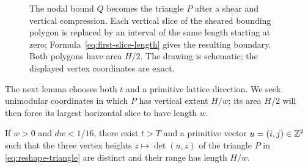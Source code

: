 \begin{figure}[tbp]
\centering
{}
\caption{The nodal bound $Q$ becomes the triangle $P$ after a shear and
vertical compression.  Each vertical slice of the sheared bounding polygon
is replaced by an interval of the same length starting at zero;
Formula~\eqref{eq:first-slice-length}
gives the resulting boundary.  Both polygons have area $H/2$.  The drawing
is schematic; the displayed vertex coordinates are exact.}
\label{fig:reshape-polygons}
\end{figure}

The next lemma chooses both $t$ and a primitive lattice direction.  We
seek unimodular coordinates in which $P$ has vertical extent $H/w$;
its area $H/2$ will then force its largest horizontal slice to have
length $w$.

\begin{lemma}\label{lem:primitive-height}
If $w>0$ and $dw<1/16$, there exist $t>T$ and a primitive vector
$u=(i,j)\in\mathbb Z^2$ such that the three vertex heights
$z\mapsto\det(u,z)$ of the triangle $P$ in
\eqref{eq:reshape-triangle} are distinct and their range has length $H/w$.
\end{lemma}

